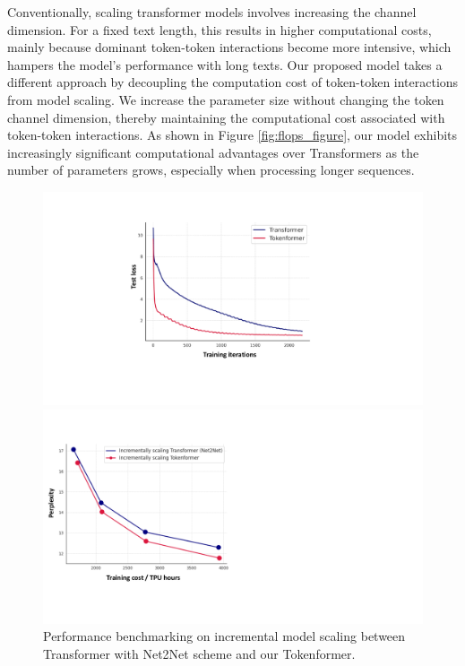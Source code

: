\documentclass{article} %
\newcommand{\ourmethod}{Tokenformer\xspace}
\begin{document}
Conventionally, scaling transformer models involves increasing the channel dimension. For a fixed text length, this results in higher computational costs, mainly because dominant token-token interactions become more intensive, which hampers the model's performance with long texts. Our proposed model takes a different approach by decoupling the computation cost of token-token interactions from model scaling. We increase the parameter size without changing the token channel dimension, thereby maintaining the computational cost associated with token-token interactions. As shown in Figure \ref{fig:flops_figure}, our model exhibits increasingly significant computational advantages over Transformers as the number of parameters grows, especially when processing longer sequences.
\begin{figure}[t]
    \centering
    \begin{minipage}{0.49\textwidth}
        \centering
        \includegraphics[width=\linewidth]{./zero_init_v2.pdf}
        \caption{Loss curves comparing pre-trained Transformer and \ourmethod as their parameters are scaled during continued training on enwik8.}
        \label{fig:zero_init}
    \end{minipage}%
    \hfill
    \begin{minipage}{0.49\textwidth}
        \centering
        \includegraphics[width=\linewidth]{./trans_vs_token.pdf}
        \caption{Performance benchmarking on incremental model scaling between Transformer with Net2Net scheme and our \ourmethod.}
        \label{fig:comparision_tf_to}
    \end{minipage}
\end{figure}
\end{document}
